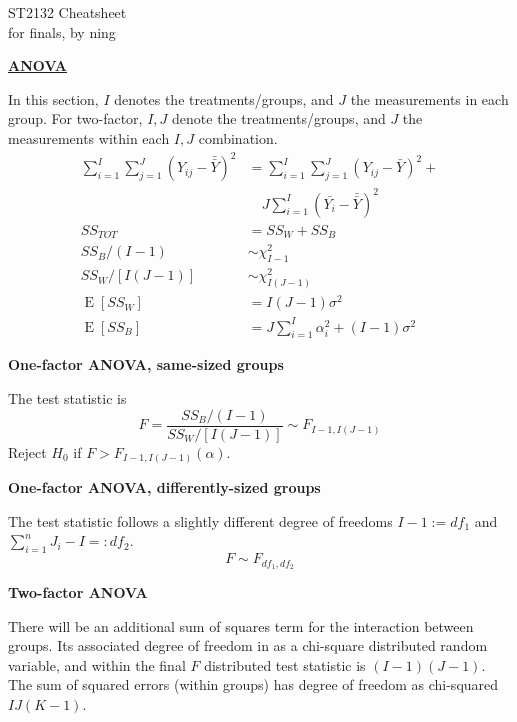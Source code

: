 \documentclass[a4paper]{article}
\newcommand{\heading}[1]{{\small\underline{\textbf{#1}}}\smallskip}
\newcommand{\subheading}[1]{{\scriptsize\textbf{#1}}}
\renewenvironment{section}[1]
  {
    \subheading{#1}\smallskip

  }{
    \medskip
  }
\newcommand{\expectation}[1]{\operatorname{E}[#1]}
\begin{document}
\scriptsize                         %
\setlength\parindent{0pt}           %
\setlength{\abovedisplayskip}{3pt}  %
\setlength{\belowdisplayskip}{3pt}  %

\begin{center}
  {\large ST2132 Cheatsheet}\\{for finals, by ning}
\end{center}

\begin{multicols*}{4}

\heading{ANOVA}

In this section, $I$ denotes the treatments/groups, and $J$ the measurements in
each group. For two-factor, $I, J$ denote the treatments/groups, and $J$ the
measurements within each $I, J$ combination.
\begin{align*}
  \sum^I_{i=1}\sum^J_{j=1} (Y_{ij} - \bar{\bar{Y}})^2
    &= \sum^I_{i=1}\sum^J_{j=1} (Y_{ij} - \bar{Y})^2 + \\
    &\quad J\sum^I_{i=1} (\bar{Y_i} - \bar{\bar{Y}})^2 \\
  SS_{TOT} &= SS_W + SS_B \\
  SS_B/(I-1) &\sim \chi^2_{I-1} \\
  SS_W/[I(J-1)] &\sim \chi^2_{I(J-1)} \\
  \expectation{SS_W} &= I(J-1)\sigma^2 \\
  \expectation{SS_B} &= J\sum^I_{i=1} \alpha_i^2 + (I-1)\sigma^2
\end{align*}

\begin{section}{One-factor ANOVA, same-sized groups}
  The test statistic is
  $$F = \frac{SS_B/(I-1)}{SS_W/[I(J-1)]}
    \sim F_{I-1, I(J-1)}$$
  Reject $H_0$ if  $F > F_{I-1, I(J-1)}(\alpha)$.
\end{section}

\begin{section}{One-factor ANOVA, differently-sized groups}
  The test statistic follows a slightly different degree of freedoms $I-1 :=
  df_1$ and $\sum^n_{i=1} J_i - I =: df_2$.
  $$F \sim F_{df_1, df_2}$$
\end{section}

\begin{section}{Two-factor ANOVA}
  There will be an additional sum of squares term for the interaction between
  groups. Its associated degree of freedom in as a chi-square distributed random
  variable, and within the final $F$ distributed test statistic is $(I-1)(J-1)$.
  The sum of squared errors (within groups) has degree of freedom as chi-squared
  $IJ(K-1)$.
\end{section}


\end{multicols*}
\end{document}
